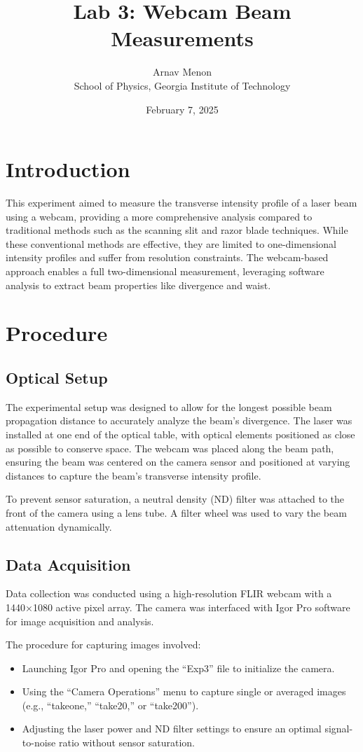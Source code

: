 \documentclass[12pt]{article}
\title{Lab 3: Webcam Beam Measurements}
\author{Arnav Menon \\ School of Physics, Georgia Institute of Technology}
\date{February 7, 2025}
\begin{document}
\maketitle

\section{Introduction}
This experiment aimed to measure the transverse intensity profile of a laser beam using a webcam, providing a more comprehensive analysis compared to traditional methods such as the scanning slit and razor blade techniques. While these conventional methods are effective, they are limited to one-dimensional intensity profiles and suffer from resolution constraints. The webcam-based approach enables a full two-dimensional measurement, leveraging software analysis to extract beam properties like divergence and waist.

\section{Procedure}
\subsection{Optical Setup}
The experimental setup was designed to allow for the longest possible beam propagation distance to accurately analyze the beam’s divergence. The laser was installed at one end of the optical table, with optical elements positioned as close as possible to conserve space. The webcam was placed along the beam path, ensuring the beam was centered on the camera sensor and positioned at varying distances to capture the beam's transverse intensity profile.

To prevent sensor saturation, a neutral density (ND) filter was attached to the front of the camera using a lens tube. A filter wheel was used to vary the beam attenuation dynamically.

\subsection{Data Acquisition}
Data collection was conducted using a high-resolution FLIR webcam with a 1440×1080 active pixel array. The camera was interfaced with Igor Pro software for image acquisition and analysis. 

The procedure for capturing images involved:
\begin{itemize}
    \item Launching Igor Pro and opening the ``Exp3'' file to initialize the camera.
    \item Using the ``Camera Operations'' menu to capture single or averaged images (e.g., ``takeone,'' ``take20,'' or ``take200'').
    \item Adjusting the laser power and ND filter settings to ensure an optimal signal-to-noise ratio without sensor saturation.
\end{itemize}
\end{document}
